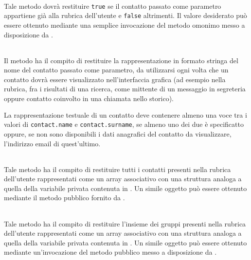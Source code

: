 \begin{description}

\item{}\\
Tale metodo dovrà restituire \verb'true' se il contatto passato come parametro appartiene già alla rubrica dell'utente e \verb'false' altrimenti. Il valore desiderato può essere ottenuto mediante una semplice invocazione del metodo omonimo messo a disposizione da .

\item{}\\
Il metodo ha il compito di restituire la rappresentazione in formato stringa del nome del contatto passato come parametro, da utilizzarsi ogni volta che un contatto dovrà essere visualizzato nell'interfaccia grafica (ad esempio nella rubrica, fra i risultati di una ricerca, come mittente di un messaggio in segreteria oppure contatto coinvolto in una chiamata nello storico).

La rappresentazione testuale di un contatto deve contenere almeno una voce tra i valori di \verb'contact.name' e \verb'contact.surname', se almeno uno dei due è specificatto oppure, se non sono disponibili i dati anagrafici del contatto da visualizzare, l'indirizzo email di quest'ultimo.

\item{}\\
Tale metodo ha il compito di restituire tutti i contatti presenti nella rubrica dell'utente rappresentati come un array associativo con una struttura analoga a quella della variabile privata  contenuta in . Un simile oggetto può essere ottenuto mediante il metodo pubblico  fornito da .

\item{}\\
Tale metodo ha il compito di restituire l'insieme dei gruppi presenti nella rubrica dell'utente rappresentati come un array associativo con una struttura analoga a quella della variabile privata  contenuta in . Un simile oggetto può essere ottenuto mediante un'invocazione del metodo pubblico  messo a disposizione da .


\end{description}
